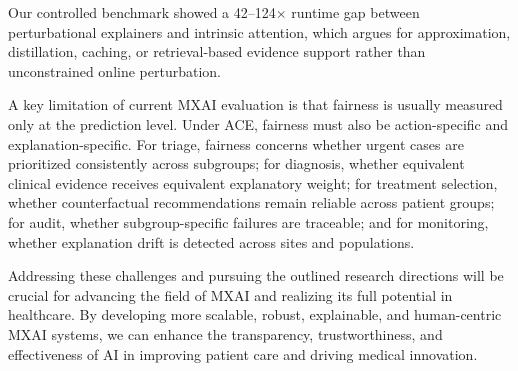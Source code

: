 \documentclass[pdflatex,sn-mathphys-num]{sn-jnl}%
\theoremstyle{thmstyleone}%
\theoremstyle{thmstyletwo}%
\theoremstyle{thmstylethree}%
\begin{document}
\begin{itemize}

Our controlled benchmark showed a 42--124$\times$ runtime gap between perturbational explainers and intrinsic attention, which argues for approximation, distillation, caching, or retrieval-based evidence support rather than unconstrained online perturbation.

A key limitation of current MXAI evaluation is that fairness is usually measured only at the prediction level. Under ACE, fairness must also be action-specific and explanation-specific. For triage, fairness concerns whether urgent cases are prioritized consistently across subgroups; for diagnosis, whether equivalent clinical evidence receives equivalent explanatory weight; for treatment selection, whether counterfactual recommendations remain reliable across patient groups; for audit, whether subgroup-specific failures are traceable; and for monitoring, whether explanation drift is detected across sites and populations. 

Addressing these challenges and pursuing the outlined research directions will be crucial for advancing the field of MXAI and realizing its full potential in healthcare. By developing more scalable, robust, explainable, and human-centric MXAI systems, we can enhance the transparency, trustworthiness, and effectiveness of AI in improving patient care and driving medical innovation.


\end{itemize}
\end{document}
